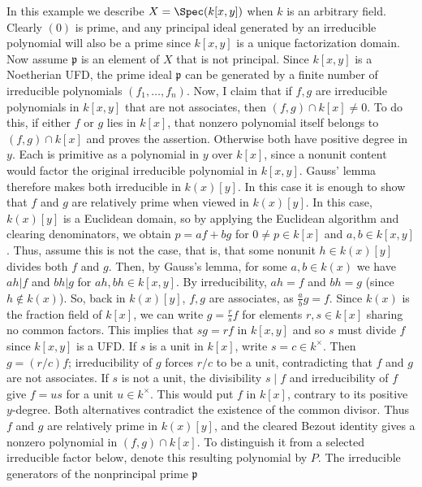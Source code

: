 \begin{example}
\label{example-spec-kxy}
In this example we describe $X = \Spec(k[x, y])$
when $k$ is an arbitrary field.
Clearly $(0)$ is prime, and any principal ideal generated by an
irreducible polynomial will also be a prime since $k[x, y]$ is a
unique factorization domain. Now assume $\mathfrak p$ is an
element of $X$ that is not principal. Since $k[x, y]$ is a
Noetherian UFD, the prime ideal $\mathfrak p$ can be generated
by a finite number of irreducible polynomials $(f_1, \ldots, f_n)$.
Now, I claim that if $f, g$ are irreducible polynomials in $k[x, y]$
that are not associates, then $(f, g) \cap k[x] \neq 0$. To do this,
if either $f$ or $g$ lies in $k[x]$, that nonzero polynomial
itself belongs to $(f,g)\cap k[x]$ and proves the assertion.
Otherwise both have positive degree in $y$. Each is primitive as
a polynomial in $y$ over $k[x]$, since a nonunit content would
factor the original irreducible polynomial in $k[x,y]$.
Gauss' lemma therefore makes both irreducible in $k(x)[y]$.
In this case it is enough to show that $f$ and $g$ are relatively prime when
viewed in $k(x)[y]$. In this case, $k(x)[y]$ is a Euclidean domain,
so by applying the Euclidean algorithm and clearing denominators, we
obtain $p = af + bg$ for $0 \ne p \in k[x]$ and $a, b \in k[x, y]$. Thus, assume this is not
the case, that is, that some nonunit $h \in k(x)[y]$ divides both
$f$ and $g$. Then, by Gauss's lemma, for some $a, b \in k(x)$ we
have $ah | f$ and $bh | g$ for $ah, bh \in k[x, y]$. By
irreducibility, $ah = f$ and
$bh = g$ (since $h \notin k(x)$). So, back in $k(x)[y]$, $f, g $
are associates, as $\frac{a}{b} g = f$. Since
$k(x)$ is the fraction field of $k[x]$, we can write $g = \frac{r}{s} f $
for elements $r , s \in k[x]$ sharing no common factors. This
implies that $sg = rf$ in $k[x, y]$ and so $s$ must divide $f$
since $k[x,y]$ is a UFD. If $s$ is a unit in $k[x]$, write
$s=c\in k^\times$. Then $g=(r/c)f$; irreducibility of $g$
forces $r/c$ to be a unit, contradicting that $f$ and $g$ are
not associates. If $s$ is not a unit, the divisibility $s\mid f$
and irreducibility of $f$ give $f=us$ for a unit $u\in k^\times$.
This would put $f$ in $k[x]$, contrary to its positive $y$-degree.
Both alternatives contradict the existence of the common divisor.
Thus $f$ and $g$ are relatively prime in $k(x)[y]$, and the
cleared Bezout identity gives a nonzero polynomial in $(f,g)\cap k[x]$.
To distinguish it from a selected irreducible factor below, denote
this resulting polynomial by $P$.
The irreducible generators of the nonprincipal prime $\mathfrak p$

\end{example}
